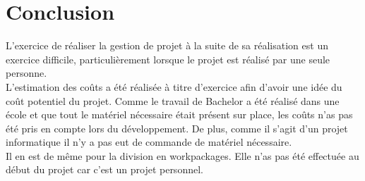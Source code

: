 \documentclass[AdvProjMgmt_Sebastien_Deriaz]{subfiles}
\begin{document}
\section{Conclusion}
L'exercice de réaliser la gestion de projet à la suite de sa réalisation est un exercice difficile, particulièrement lorsque le projet est réalisé par une seule personne.\\
L'estimation des coûts a été réalisée à titre d'exercice afin d'avoir une idée du coût potentiel du projet. Comme le travail de Bachelor a été réalisé dans une école et que tout le matériel nécessaire était présent sur place, les coûts n'as pas été pris en compte lors du développement. De plus, comme il s'agit d'un projet informatique il n'y a pas eut de commande de matériel nécessaire.\\
Il en est de même pour la division en workpackages. Elle n'as pas été effectuée au début du projet car c'est un projet personnel.
\end{document}
